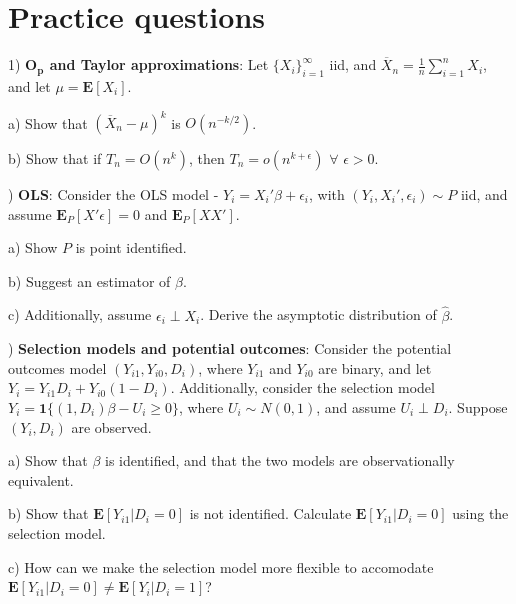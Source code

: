\documentclass[12pt,english]{article}
\begin{document}
\section{Practice questions}

1) \textbf{$\mathbf{O_{p}}$ and Taylor approximations}: Let $\{ X_{i} \}_{i=1}^{\infty}$ iid, and $\overline{X}_{n} = \frac{1}{n} \sum_{i=1}^{n} X_{i}$, and let $\mu = \mathbf{E}[X_{i}]$.

a) Show that $ ( \overline{X}_{n} - \mu )^{k}$ is $O\left(n^{-k/2}\right)$.

b) Show that if $T_{n} = O(n^{k})$, then $T_{n} = o(n^{k + \epsilon})$ $\forall$ $\epsilon > 0$.

\vspace{1em}
) \textbf{OLS}: Consider the OLS model - $Y_{i} = X_{i}'\beta + \epsilon_{i}$, with $(Y_{i}, X_{i}', \epsilon_{i}) \sim P$ iid, and assume $\mathbf{E}_{P}[X'\epsilon] = 0$ and $\mathbf{E}_{P}[XX']$.

a) Show $P$ is point identified.

b) Suggest an estimator of $\beta$.

c) Additionally, assume $\epsilon_{i} \perp X_{i}$. Derive the asymptotic distribution of $\hat{\beta}$.

\vspace{1em}
) \textbf{Selection models and potential outcomes}: Consider the potential outcomes model $(Y_{i1}, Y_{i0}, D_{i})$, where $Y_{i1}$ and $Y_{i0}$ are binary, and let $Y_{i} = Y_{i1} D_{i} + Y_{i0} (1 - D_{i})$. Additionally, consider the selection model $Y_{i} = \mathbf{1}\{ (1,  D_{i}) \beta - U_{i} \geq 0 \}$, where $U_{i} \sim N(0, 1)$, and assume $U_{i} \perp D_{i}$. Suppose $(Y_{i}, D_{i})$ are observed.

a) Show that $\beta$ is identified, and that the two models are observationally equivalent.

b) Show that $\mathbf{E}[Y_{i1} | D_{i} = 0]$ is not identified. Calculate $\mathbf{E}[Y_{i1} | D_{i} = 0]$ using the selection model.

c) How can we make the selection model more flexible to accomodate $\mathbf{E}[Y_{i1} | D_{i} = 0] \neq \mathbf{E}[Y_{i} | D_{i} = 1]$?
\end{document}
